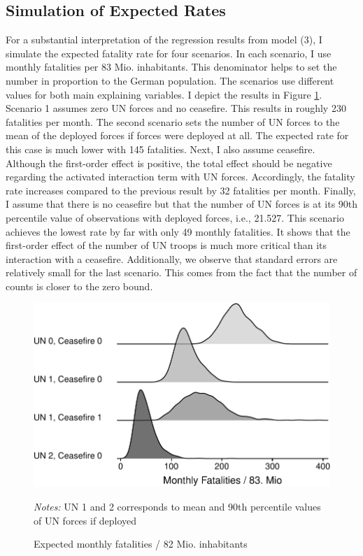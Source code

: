 \documentclass[12pt,english,a4paper,oneside]{article}
\begin{document}
\hypertarget{simulation-of-expected-rates}{%
\subsection{Simulation of Expected Rates}\label{simulation-of-expected-rates}}

For a substantial interpretation of the regression results from model (3), I simulate the expected fatality rate for four scenarios. In each scenario, I use monthly fatalities per 83 Mio. inhabitants. This denominator helps to set the number in proportion to the German population. The scenarios use different values for both main explaining variables. I depict the results in Figure \ref{fig:scenarios}. Scenario 1 assumes zero UN forces and no ceasefire. This results in roughly 230 fatalities per month. The second scenario sets the number of UN forces to the mean of the deployed forces if forces were deployed at all. The expected rate for this case is much lower with 145 fatalities. Next, I also assume ceasefire. Although the first-order effect is positive, the total effect should be negative regarding the activated interaction term with UN forces. Accordingly, the fatality rate increases compared to the previous result by 32 fatalities per month. Finally, I assume that there is no ceasefire but that the number of UN forces is at its 90th percentile value of observations with deployed forces, i.e., 21.527. This scenario achieves the lowest rate by far with only 49 monthly fatalities. It shows that the first-order effect of the number of UN troops is much more critical than its interaction with a ceasefire. Additionally, we observe that standard errors are relatively small for the last scenario. This comes from the fact that the number of counts is closer to the zero bound.

\begin{figure}
\includegraphics[width=\textwidth]{figs/scenarios-1} \caption[Expected monthly fatalities / 82 Mio]{Expected monthly fatalities / 82 Mio. inhabitants}\label{fig:scenarios}
\vspace{0.5cm} \footnotesize{\textit{Notes: }UN 1 and 2 corresponds to mean and 90th percentile values of UN forces if deployed} \end{figure}
\end{document}
